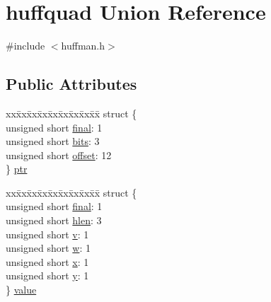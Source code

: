 \hypertarget{unionhuffquad}{}\section{huffquad Union Reference}
\label{unionhuffquad}


{\ttfamily \#include $<$huffman.\+h$>$}

\subsection*{Public Attributes}
\begin{DoxyCompactItemize}
\item 
\begin{tabbing}
xx\=xx\=xx\=xx\=xx\=xx\=xx\=xx\=xx\=\kill
struct \{\\
\>unsigned short \hyperlink{unionhuffquad_a5bd7265016b81380790dc448a03d55f6}{final}: 1\\
\>unsigned short \hyperlink{unionhuffquad_af07dd1c6263252b8d1120ff3af38112e}{bits}: 3\\
\>unsigned short \hyperlink{unionhuffquad_affd7aad1d4e86800b4289671b6d40c5c}{offset}: 12\\
\} \hyperlink{unionhuffquad_ab07abb4ebfb64a6f8eb83942c68b9336}{ptr}\\

\end{tabbing}\item 
\begin{tabbing}
xx\=xx\=xx\=xx\=xx\=xx\=xx\=xx\=xx\=\kill
struct \{\\
\>unsigned short \hyperlink{unionhuffquad_a5bd7265016b81380790dc448a03d55f6}{final}: 1\\
\>unsigned short \hyperlink{unionhuffquad_acd69822487b43dafe7145ba1d1877beb}{hlen}: 3\\
\>unsigned short \hyperlink{unionhuffquad_a7dd703f536a1269c3e69a9a02af3a9d5}{v}: 1\\
\>unsigned short \hyperlink{unionhuffquad_aba9f3e52963ffdbf2cc485db947e4f11}{w}: 1\\
\>unsigned short \hyperlink{unionhuffquad_a7d679c557c749ada44575e67bb8e6cfa}{x}: 1\\
\>unsigned short \hyperlink{unionhuffquad_ab87ddc690b6cda574a61d4cf432f134a}{y}: 1\\
\} \hyperlink{unionhuffquad_ad738d41de7d930727a827cfe7a29f58c}{value}\\

\end{tabbing}\end{DoxyCompactItemize}


